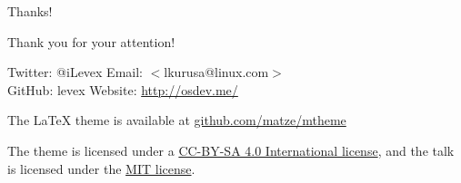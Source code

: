 \documentclass{beamer} %
\makeatletter
\newcommand*{\emailify}[1]{$<$#1$>$}
\newcommand*{\myemail}{\emailify{lkurusa@linux.com}}
\makeatother
\begin{document}
\begin{frame}{Thanks!}
\begin{center}
Thank you for your attention! \par
\end{center}

Twitter: @iLevex \hfill Email: \myemail \\
GitHub: levex \hfill Website: \url{http://osdev.me/}

\vspace{1cm}

\begin{small}
The \LaTeX\hskip1mm theme is available at \url{github.com/matze/mtheme}

The theme is licensed under a
\href{http://creativecommons.org/licenses/by-sa/4.0/}{CC-BY-SA 4.0 International license},
and the talk is licensed under the \href{https://opensource.org/licenses/MIT}{MIT license}.

\end{small}

\end{frame}
\end{document}
